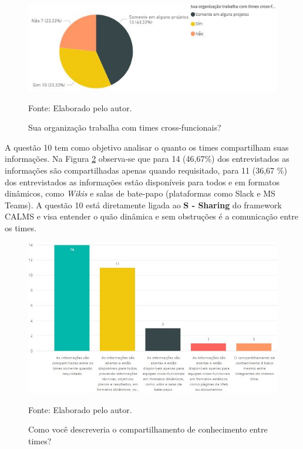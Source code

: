 \documentclass[twoside,english,brazilian]{UNISINOSartigo}
\newcommand{\source}[1]{\caption*{Fonte: {#1}} }
\begin{document}
\begin{figure}[H]
    \centering
    \caption{Sua organização trabalha com times cross-funcionais?}
       \includegraphics[scale=.63]{imagens/crossFuncionais_PBI.JPG}
        \source{Elaborado pelo autor.}
    \label{fig:crossFuncionais}
\end{figure}
A questão 10 tem como objetivo analisar o quanto os times compartilham suas informações. Na Figura \ref{fig:compartConhecimento} observa-se que para 14 (46,67\%) dos entrevistados as informações são compartilhadas apenas quando requisitado, para 11 (36,67 \%) dos entrevistados as informações estão disponíveis para todos e em formatos dinâmicos, como \textit{Wikis} e salas de bate-papo (plataformas como Slack e MS Teams). 
A questão 10 está diretamente ligada ao \textbf{S - Sharing} do framework CALMS e visa entender o quão dinâmica e sem obstruções é a comunicação entre os times. 
\newline
\begin{figure}[H]
    \centering
    \caption{Como você descreveria o compartilhamento de conhecimento entre times?}
       \includegraphics[scale=.6]{imagens/compartilhamentoConhecimento.JPG}
        \source{Elaborado pelo autor.}
    \label{fig:compartConhecimento}
\end{figure}
\end{document}
